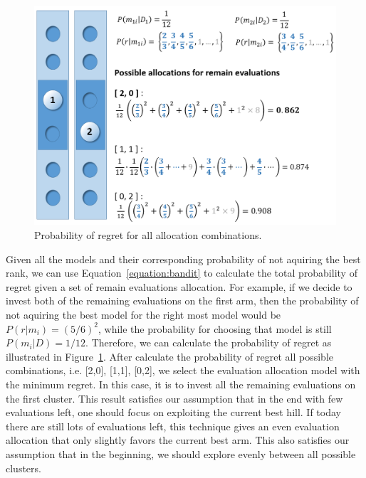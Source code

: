 \begin{figure}
\centering
\includegraphics[width=\textwidth]{Bandit_regret}
\caption{Probability of regret for all allocation combinations.}\label{fig:Bandit_regret}
\end{figure} 
Given all the models and their corresponding probability of not aquiring the best rank, 
we can use Equation~\ref{equation:bandit} to calculate the total probability of regret given a set of remain evaluations allocation.
For example, if we decide to invest both of the remaining evaluations on the first arm,
then the probability of not aquiring the best model for the right most model would be $P(r|m_i) = (5/6)^2$,
while the probability for choosing that model is still $P(m_i|D) = 1/12$.
Therefore, we can calculate the probability of regret as illustrated in Figure~\ref{fig:Bandit_regret}.
After calculate the probability of regret all possible combinations, i.e. [2,0], [1,1], [0,2], 
we select the evaluation allocation model with the minimum regret.
In this case, it is to invest all the remaining evaluations on the first cluster.
This result satisfies our assumption that in the end with few evaluations left, 
one should focus on exploiting the current best hill.
If today there are still lots of evaluations left, 
this technique gives an even evaluation allocation that only slightly favors the current best arm.
This also satisfies our assumption that in the beginning, we should explore evenly between all possible clusters.


